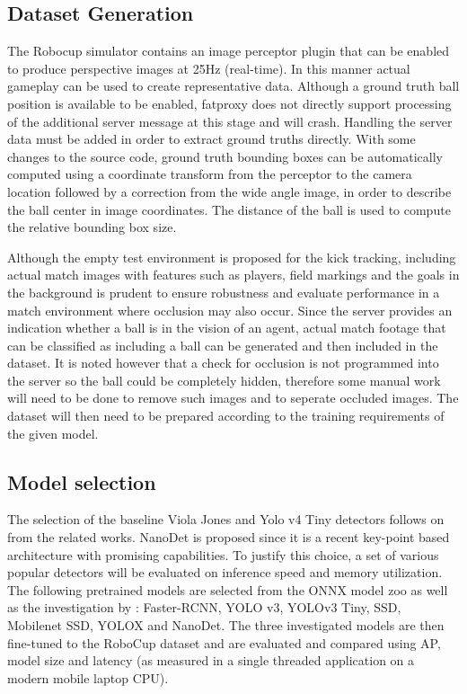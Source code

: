 \documentclass[a4paper,twoside,12pt]{report}
\begin{document}
\subsection{Dataset Generation}

The Robocup simulator contains an image perceptor plugin that can be enabled to produce perspective images at 25Hz (real-time). In this manner actual gameplay can be used to create representative data. Although a ground truth ball position is available to be enabled, fatproxy does not directly support processing of the additional server message at this stage and will crash. Handling the server data must be added in order to extract ground truths directly. With some changes to the source code, ground truth bounding boxes can be automatically computed using a coordinate transform from the perceptor to the camera location followed by a correction from the wide angle image, in order to describe the ball center in image coordinates. The distance of the ball is used to compute the relative bounding box size.

Although the empty test environment is proposed for the kick tracking, including actual match images with features such as players, field markings and the goals in the background is prudent to ensure robustness and evaluate performance in a match environment where occlusion may also occur. Since the server provides an indication whether a ball is in the vision of an agent, actual match footage that can be classified as including a ball can be generated and then included in the dataset. It is noted however that a check for occlusion is not programmed into the server so the ball could be completely hidden, therefore some manual work will need to be done to remove such images and to seperate occluded images. The dataset will then need to be prepared according to the training requirements of the given model.

\subsection{Model selection}

The selection of the baseline Viola Jones and Yolo v4 Tiny detectors follows on from the related works. NanoDet is proposed since it is a recent key-point based architecture with promising capabilities. To justify this choice, a set of various popular detectors will be evaluated on inference speed and memory utilization. The following pretrained models are selected from the ONNX model zoo \citep{modelzoo} as well as the investigation by \cite{comprehensive}: Faster-RCNN, YOLO v3, YOLOv3 Tiny, SSD, Mobilenet SSD, YOLOX and NanoDet. The three investigated models are then fine-tuned to the RoboCup dataset and are evaluated and compared using AP, model size and latency (as measured in a single threaded application on a modern mobile laptop CPU).
\end{document}
